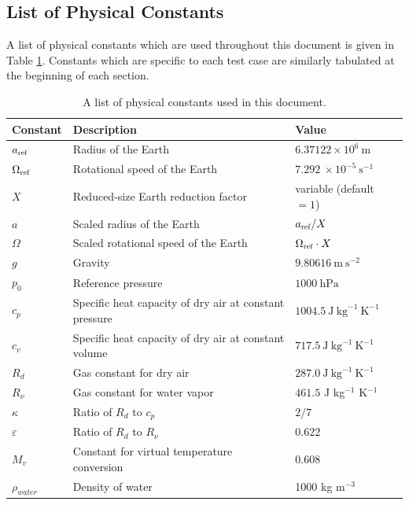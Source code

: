 \documentclass[times,doublespace]{fldauth}
\begin{document}
\subsection{List of Physical Constants}
A list of physical constants which are used throughout this document is given in Table \ref{tab:PhysicalConstants}.  Constants which are specific to each test case are similarly tabulated at the beginning of each section.

\begin{table}[h]
\caption{A list of physical constants used in this document.} \label{tab:PhysicalConstants}
\begin{tabular*}{\textwidth}{@{\extracolsep{\fill}}lll}
\hline Constant & Description & Value \\
\hline $a_{\tiny \mbox{ref}}$ & Radius of the Earth & $6.37122 \times 10^{6}\ \mbox{m}$ \\
$\Omega_{\tiny \mbox{ref}}$ & Rotational speed of the Earth & $7.292\ \times 10^{-5}\ \mbox{s}^{-1}$ \\
$X$ & Reduced-size Earth reduction factor & variable (default $= 1$) \\
$a$ & Scaled radius of the Earth & $a_{\tiny \mbox{ref}} / X$ \\
$\Omega$ & Scaled rotational speed of the Earth & $\Omega_{\tiny \mbox{ref}} \cdot X$ \\
$g$ & Gravity & $9.80616\ \mbox{m}\ \mbox{s}^{-2}$ \\
$p_0$ & Reference pressure & $1000\ \mbox{hPa}$ \\
$c_p$ & Specific heat capacity of dry air at constant pressure & $1004.5\ \mbox{J}\ \mbox{kg}^{-1}\ \mbox{K}^{-1}$ \\
$c_v$ & Specific heat capacity of dry air at constant volume & $717.5\ \mbox{J}\ \mbox{kg}^{-1}\ \mbox{K}^{-1}$ \\
$R_d$ & Gas constant for dry air & $287.0\ \mbox{J}\ \mbox{kg}^{-1}\ \mbox{K}^{-1}$ \\
$R_\nu$ & Gas constant for water vapor & $461.5$ J kg$^{-1}$ K$^{-1}$ \\
$\kappa$ & Ratio of $R_d$ to $c_p$ & $2/7$ \\
$\varepsilon$ & Ratio of $R_d$ to $R_\nu$ & $0.622$ \\
$M_v$ & Constant for virtual temperature conversion & $0.608$ \\
$\rho_{water}$ & Density of water & 1000 kg m$^{-3}$ \\
\hline 
\end{tabular*}

\end{table}
\end{document}
